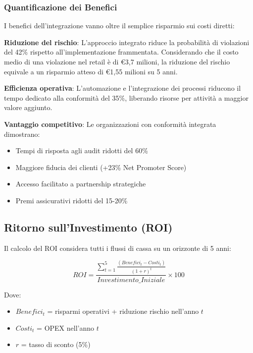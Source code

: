 \subsubsection{Quantificazione dei Benefici}

I benefici dell'integrazione vanno oltre il semplice risparmio sui costi diretti:

\textbf{Riduzione del rischio}: L'approccio integrato riduce la probabilità di violazioni del 42\% rispetto all'implementazione frammentata. Considerando che il costo medio di una violazione nel retail è di €3,7 milioni\autocite{ibm2024cost}, la riduzione del rischio equivale a un risparmio atteso di €1,55 milioni su 5 anni.

\textbf{Efficienza operativa}: L'automazione e l'integrazione dei processi riducono il tempo dedicato alla conformità del 35\%, liberando risorse per attività a maggior valore aggiunto.

\textbf{Vantaggio competitivo}: Le organizzazioni con conformità integrata dimostrano:
\begin{itemize}
    \item Tempi di risposta agli audit ridotti del 60\%
    \item Maggiore fiducia dei clienti (+23\% Net Promoter Score)
    \item Accesso facilitato a partnership strategiche
    \item Premi assicurativi ridotti del 15-20\%
\end{itemize}

\subsection{Ritorno sull'Investimento (ROI)}
\label{subsec:4.5.2_roi}

Il calcolo del ROI considera tutti i flussi di cassa su un orizzonte di 5 anni:

\begin{equation}
ROI = \frac{\sum_{t=1}^{5} \frac{(Benefici_t - Costi_t)}{(1+r)^t}}{Investimento\_Iniziale} \times 100
\end{equation}

Dove:
\begin{itemize}
    \item $Benefici_t$ = risparmi operativi + riduzione rischio nell'anno $t$
    \item $Costi_t$ = OPEX nell'anno $t$
    \item $r$ = tasso di sconto (5\%)
\end{itemize}

